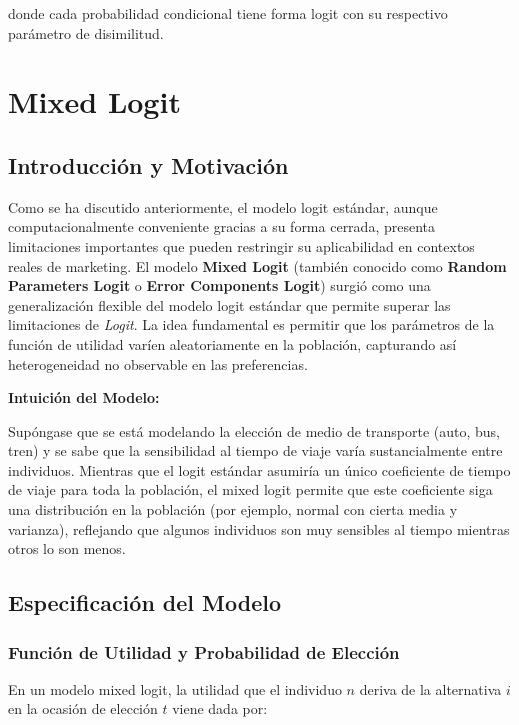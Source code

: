 \documentclass[
]{book}
\begin{document}
donde cada probabilidad condicional tiene forma logit con su respectivo parámetro de disimilitud.

\section{Mixed Logit}\label{mixed-logit}

\subsection{Introducción y Motivación}\label{introducciuxf3n-y-motivaciuxf3n}

Como se ha discutido anteriormente, el modelo logit estándar, aunque computacionalmente conveniente gracias a su forma cerrada, presenta limitaciones importantes que pueden restringir su aplicabilidad en contextos reales de marketing. El modelo \textbf{Mixed Logit} (también conocido como \textbf{Random Parameters Logit} o \textbf{Error Components Logit}) surgió como una generalización flexible del modelo logit estándar que permite superar las limitaciones de \emph{Logit}. La idea fundamental es permitir que los parámetros de la función de utilidad varíen aleatoriamente en la población, capturando así heterogeneidad no observable en las preferencias.

\textbf{Intuición del Modelo:}

Supóngase que se está modelando la elección de medio de transporte (auto, bus, tren) y se sabe que la sensibilidad al tiempo de viaje varía sustancialmente entre individuos. Mientras que el logit estándar asumiría un único coeficiente de tiempo de viaje para toda la población, el mixed logit permite que este coeficiente siga una distribución en la población (por ejemplo, normal con cierta media y varianza), reflejando que algunos individuos son muy sensibles al tiempo mientras otros lo son menos.

\subsection{Especificación del Modelo}\label{especificaciuxf3n-del-modelo}

\subsubsection{Función de Utilidad y Probabilidad de Elección}\label{funciuxf3n-de-utilidad-y-probabilidad-de-elecciuxf3n}

En un modelo mixed logit, la utilidad que el individuo \(n\) deriva de la alternativa \(i\) en la ocasión de elección \(t\) viene dada por:
\end{document}
